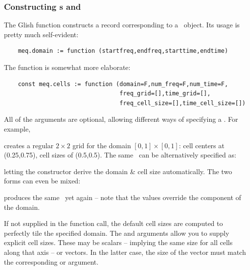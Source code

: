 \documentclass[10pt,twoside]{book}
\begin{document}
\subsubsection{Constructing \Domain{}s and \Cells{}}

  The Glish  function constructs a record corresponding to
  a \Domain\ object. Its usage is pretty much self-evident:
  
  \begin{verbatim}
    meq.domain := function (startfreq,endfreq,starttime,endtime)
  \end{verbatim}
  
  The  function is somewhat more elaborate:
  
  \begin{verbatim}
    const meq.cells := function (domain=F,num_freq=F,num_time=F,
                                 freq_grid=[],time_grid=[],
                                 freq_cell_size=[],time_cell_size=[])
  \end{verbatim}

  All of the arguments are optional, allowing different ways of specifying 
  a \Cells. For example,
  
  
  creates a regular $2\times 2$ grid for the domain $[0,1]\times[0,1]$: cell
  centers at (0.25,0.75), cell sizes of (0.5,0.5). The same \Cells\ can be
  alternatively specified as:
  
  
  letting the constructor derive the domain \& cell size automatically. The
  two forms can even be mixed:
  
  
  produces the same \Cells\ yet again -- note that the  
  values override the  component of the domain.
  
  If not supplied in the function call, the default cell sizes are computed to
  perfectly tile the specified domain. The  and
   arguments allow you to supply explicit cell sizes.
  These may be scalars -- implying the same size for all cells along that axis
  -- or vectors. In the latter case, the size of the vector must match
  the corresponding  or  argument.
\end{document}
